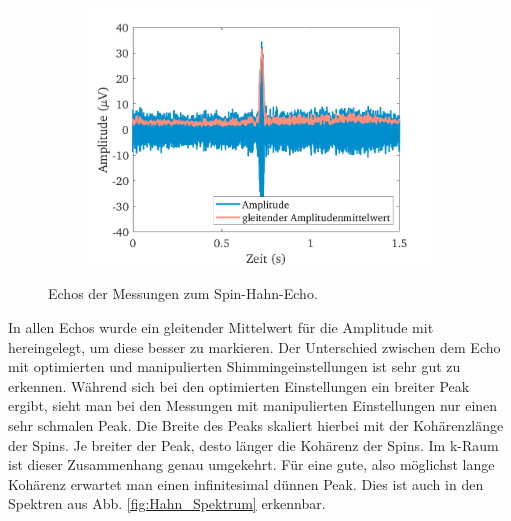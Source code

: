 \documentclass[../main.tex]{subfiles}
\begin{document}
\begin{figure}[H]
\begin{subfigure}[c]{0.5\textwidth}
                \includegraphics[width=\linewidth]{Bilddateien/9/worse_positive/Fig_1}
                \label{fig:Hahn_FID_pos}
            \end{subfigure}
            \caption{Echos der Messungen zum Spin-Hahn-Echo.}
            \label{fig:Hahn_FID}
    \end{figure}
    In allen Echos wurde ein gleitender Mittelwert für die Amplitude mit hereingelegt, um diese besser zu markieren. Der Unterschied zwischen dem Echo mit optimierten und manipulierten Shimmingeinstellungen ist sehr gut zu erkennen. Während sich bei den optimierten Einstellungen ein breiter Peak ergibt, sieht man bei den Messungen mit manipulierten Einstellungen nur einen sehr schmalen Peak. Die Breite des Peaks skaliert hierbei mit der Kohärenzlänge der Spins. Je breiter der Peak, desto länger die Kohärenz der Spins. Im k-Raum ist dieser Zusammenhang genau umgekehrt. Für eine gute, also möglichst lange Kohärenz erwartet man einen infinitesimal dünnen Peak. Dies ist auch in den Spektren aus Abb. \ref{fig:Hahn_Spektrum} erkennbar.
\end{document}
